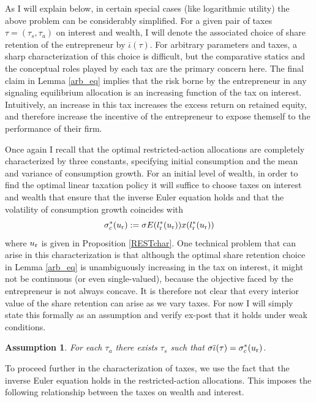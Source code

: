 \documentclass[11pt]{article}
\theoremstyle{plain}
\newtheorem{assump}{Assumption}[section]
\begin{document}
As I will explain below, in certain special cases (like logarithmic utility) the above problem can be considerably simplified. For a given pair of taxes $\tau = (\tau_s, \tau_a)$ on interest and wealth, I will denote the associated choice of share retention of the entrepreneur by $\overline{\iota}(\tau)$. For arbitrary parameters and taxes, a sharp characterization of this choice is difficult, but the comparative statics and the conceptual roles played by each tax are the primary concern here. The final claim in Lemma \ref{arb_eq} implies that the risk borne by the entrepreneur in any signaling equilibrium allocation is an increasing function of the tax on interest. Intuitively, an increase in this tax increases the excess return on retained equity, and therefore increase the incentive of the entrepreneur to expose themself to the performance of their firm. 

Once again I recall that the optimal restricted-action allocations are completely characterized by three constants, specifying initial consumption and the mean and variance of consumption growth. For an initial level of wealth, in order to find the optimal linear taxation policy it will suffice to choose taxes on interest and wealth that ensure that the inverse Euler equation holds and that the volatility of consumption growth coincides with 
\begin{equation}
\sigma_c^*(u_{\textnormal{r}}) := \sigma E(l_{\textnormal{r}}^*(u_{\textnormal{r}}))x(l_{\textnormal{r}}^*(u_{\textnormal{r}}))
\label{sig_c}
\end{equation}
where $u_{\textnormal{r}}$ is given in Proposition \ref{RESTchar}. One technical problem that can arise in this characterization is that although the optimal share retention choice in Lemma \ref{arb_eq} is unambiguously increasing in the tax on interest, it might not be continuous (or even single-valued), because the objective faced by the entrepreneur is not always concave. It is therefore not clear that every interior value of the share retention can arise as we vary taxes. For now I will simply state this formally as an assumption and verify ex-post that it holds under weak conditions.

\begin{assump} \label{imp_assump}
For each $\tau_a$ there exists $\tau_s$ such that $\sigma \overline{\iota}(\tau) = \sigma_c^*(u_{\textnormal{r}})$. 
\end{assump}

To proceed further in the characterization of taxes, we use the fact that the inverse Euler equation holds in the restricted-action allocations. This imposes the following relationship between the taxes on wealth and interest. 
\end{document}
